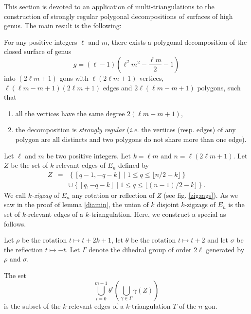 \documentclass[12pt]{amsart}
\begin{document}
This section is devoted to an application of multi-triangulations to the construction of strongly regular polygonal decompositions of surfaces of high genus. The main result is the following:

\begin{proposition}\label{decomp}
For any positive integers $\ell$ and $m$, there exists a polygonal decomposition of the closed surface of genus 
$$g=(\ell-1)(\ell^2m^2-\frac{\ell m}{2}-1)$$
into $(2\ell m+1)$-gons with $\ell(2\ell m+1)$ vertices, $\ell(\ell m-m+1)(2\ell m+1)$ edges and $2\ell(\ell m-m+1)$ polygons, such that
\begin{enumerate}
\item all the vertices have the same degree $2(\ell m-m+1)$,
\item the decomposition is \emph{strongly regular} ({\it i.e.} the vertices (resp. edges) of any polygon are all distincts and two polygons do not share more than one edge).
\end{enumerate}
\end{proposition}


Let $\ell$ and $m$ be two positive integers. Let $k=\ell m$  and $n=\ell(2\ell m+1)$.
Let $Z$ be the set of $k$-relevant edges of $E_n$ defined by
\begin{eqnarray*}
Z & = & \left\{[q-1,-q-k]\;|\; 1\le q\le \lfloor n/2-k\rfloor\right\}\\
&&\cup\left\{[q,-q-k]\;|\; 1\le q\le \lfloor (n-1)/2-k\rfloor\right\}.
\end{eqnarray*}
We call \emph{$k$-zigzag} of $E_n$ any rotation or reflection of $Z$ (see fig. \ref{zigzags}). As we saw in the proof of lemma \ref{diamin}, the union of $k$ disjoint $k$-zigzags of $E_n$ is the set of $k$-relevant edges of a $k$-triangulation. Here, we construct a special as follows.

Let $\rho$ be the rotation $t\mapsto t+2k+1$,  let $\theta$ be the rotation $t\mapsto t+2$ and let $\sigma$ be the reflection $t\mapsto -t$. Let $\Gamma$ denote the dihedral group of order $2\ell$ generated by $\rho$ and $\sigma$.

\begin{lemma}
The set
$$\bigcup_{i=0}^{m-1} \theta^i\left(\bigcup_{\gamma\in\Gamma} \gamma(Z)\right)$$
is the subset of the $k$-relevant edges of a $k$-triangulation $T$ of the $n$-gon.
\end{lemma}
\end{document}
